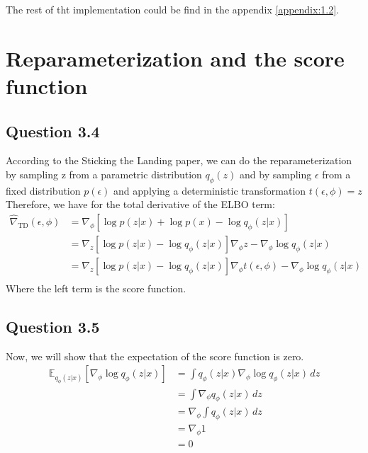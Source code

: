 \documentclass{article}
\begin{document}
The rest of tht implementation could be find in the appendix \ref{appendix:1.2}.

\section{Reparameterization and the score function}
\subsection{Question 3.4}

According to the Sticking the Landing paper, we can do the reparameterization by sampling z from a parametric distribution $q_\phi(z)$ and by sampling $\epsilon$ from a fixed distribution $p(\epsilon)$ and applying a deterministic transformation $t(\epsilon, \phi) = z$
Therefore, we have for the total derivative of the ELBO term:
\begin{equation}
  \begin{split}
    \hat{\nabla}_{\text{TD}}(\epsilon,\phi) & = \nabla_\phi[\log p(z|x) + \log p(x) - \log q_\phi (z|x)]                                              \\
                                            & = \nabla_z[\log p(z|x) - \log q_\phi(z|x)] \nabla_\phi z - \nabla_\phi \log q_\phi(z|x)                 \\
                                            & = \nabla_z[\log p(z|x) - \log q_\phi(z|x)] \nabla_\phi t(\epsilon, \phi) - \nabla_\phi \log q_\phi(z|x) \\
  \end{split}
\end{equation}
Where the left term is the score function.

\subsection{Question 3.5}
Now, we will show that the expectation of the score function is zero.
\begin{equation}
  \begin{split}
    \mathbb{E}_{q_\phi(z|x)}\left[\nabla_\phi \log q_\phi(z|x)\right] & = \int q_\phi(z|x) \nabla_\phi \log q_\phi(z|x) \,dz \\
                                                                      & = \int \nabla_\phi q_\phi(z|x) \,dz                  \\
                                                                      & = \nabla_\phi \int q_\phi(z|x) \,dz                  \\
                                                                      & = \nabla_\phi 1                                      \\
                                                                      & = 0
  \end{split}
\end{equation}
\end{document}
